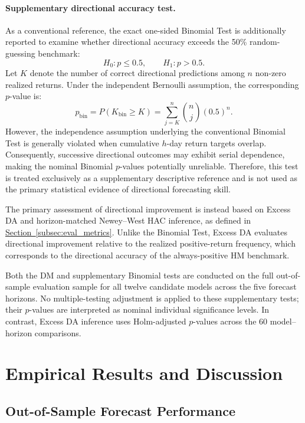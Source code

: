 \documentclass[12pt,twoside]{ord}
\begin{document}
\paragraph{Supplementary directional accuracy test.} As a conventional reference, the exact one-sided Binomial Test is additionally reported to examine whether directional accuracy exceeds the 50\% random-guessing benchmark:
\[
H_0:p\leq 0.5,
\qquad
H_1:p>0.5.
\]
Let $K$ denote the number of correct directional predictions among $n$ non-zero realized returns. Under the independent Bernoulli assumption, the corresponding $p$-value is:
\[
p_{\mathrm{bin}}
=
P(K_{\mathrm{bin}}\geq K)
=
\sum_{j=K}^{n}
\binom{n}{j}(0.5)^n.
\]
However, the independence assumption underlying the conventional Binomial Test is generally violated when cumulative $h$-day return targets overlap. Consequently, successive directional outcomes may exhibit serial dependence, making the nominal Binomial $p$-values potentially unreliable. Therefore, this test is treated exclusively as a supplementary descriptive reference and is not used as the primary statistical evidence of directional forecasting skill.

The primary assessment of directional improvement is instead based on Excess DA and horizon-matched Newey--West HAC inference, as defined in \hyperref[subsec:eval_metrics]{Section~\ref*{subsec:eval_metrics}}. Unlike the Binomial Test, Excess DA evaluates directional improvement relative to the realized positive-return frequency, which corresponds to the directional accuracy of the always-positive HM benchmark.

Both the DM and supplementary Binomial tests are conducted on the full out-of-sample evaluation sample for all twelve candidate models across the five forecast horizons. No multiple-testing adjustment is applied to these supplementary tests; their $p$-values are interpreted as nominal individual significance levels. In contrast, Excess DA inference uses Holm-adjusted $p$-values across the 60 model--horizon comparisons.

\section{Empirical Results and Discussion}\label{sec:results}

\subsection{Out-of-Sample Forecast Performance}\label{subsec:oos_performance}
\end{document}
